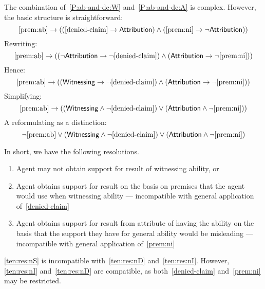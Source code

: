 \documentclass[10pt]{article}
\begin{document}
\begin{note}
  The combination of~\ref{P:ab-and-dc:W} and~\ref{P:ab-and-dc:A} is complex.
  However, the basic structure is straightforward:
  \[\ref{prem:ab} \rightarrow ((\ref{denied-claim} \rightarrow \textsf{Attribution}{}) \land (\ref{prem:ni} \rightarrow \lnot \textsf{Attribution}{}))\]
  Rewriting:
  \[\ref{prem:ab} \rightarrow ((\lnot \textsf{Attribution}{} \rightarrow \lnot \ref{denied-claim}) \land (\textsf{Attribution}{} \rightarrow \lnot \ref{prem:ni}))\]
  Hence:
    \[\ref{prem:ab} \rightarrow ((\textsf{Witnessing}{} \rightarrow \lnot \ref{denied-claim}) \land (\textsf{Attribution}{} \rightarrow \lnot \ref{prem:ni}))\]
  Simplifying:
  \[\ref{prem:ab} \rightarrow ((\textsf{Witnessing}{} \land \lnot \ref{denied-claim}) \lor (\textsf{Attribution}{} \land \lnot \ref{prem:ni}))\]
  A reformulating as a distinction:
  \[\lnot \ref{prem:ab} \lor (\textsf{Witnessing}{} \land \lnot \ref{denied-claim}) \lor (\textsf{Attribution}{} \land\lnot \ref{prem:ni})\]

  In short, we have the following resolutions.
  \begin{enumerate}
  \item\label{ten:res:nS} Agent may not obtain support for result of witnessing ability, or
  \item\label{ten:res:nD} Agent obtains support for result on the basis on premises that the agent would use when witnessing ability --- incompatible with general application of~\ref{denied-claim}
  \item\label{ten:res:nI} Agent obtains support for result from attribute of having the ability on the basis that the support they have for general ability would be misleading --- incompatible with general application of~\ref{prem:ni}
  \end{enumerate}
  \ref{ten:res:nS} is incompatible with~\ref{ten:res:nD} and~\ref{ten:res:nI}.
  However, \ref{ten:res:nI} and~\ref{ten:res:nD} are compatible, as both~\ref{denied-claim} and~\ref{prem:ni} may be restricted.
\end{note}
\end{document}
